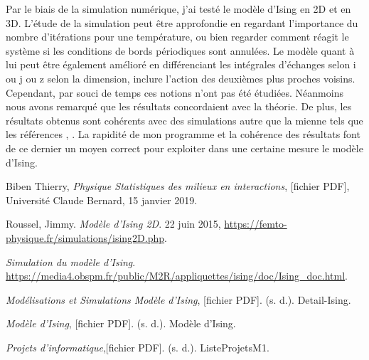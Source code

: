 \documentclass{article}
\begin{document}
Par le biais de la simulation numérique, j'ai testé le modèle d'Ising en 2D et en 3D. L'étude de la simulation peut être approfondie en regardant l'importance du nombre d'itérations pour une température, ou bien regarder comment réagit le système si les conditions de bords périodiques sont annulées. Le modèle quant à lui peut être également amélioré en différenciant les intégrales d'échanges selon i ou j ou z selon la dimension, inclure l'action des deuxièmes plus proches voisins. Cependant, par souci de temps ces notions n'ont pas été étudiées. Néanmoins nous avons remarqué que les résultats concordaient avec la théorie. De plus, les résultats obtenus sont cohérents avec des simulations autre que la mienne tels que les références \cite{Simu}, \cite{Obs}. La rapidité de mon programme et la cohérence des résultats font de ce dernier un moyen correct pour exploiter dans une certaine mesure le modèle d'Ising.


\newpage
\begin{thebibliography}{99}
Biben Thierry, \emph{Physique Statistiques des milieux en interactions}, [fichier PDF], Université Claude Bernard, 15 janvier 2019.

Roussel, Jimmy. \emph{Modèle d’Ising 2D}. 22 juin 2015, \url{https://femto-physique.fr/simulations/ising2D.php}.

\emph{Simulation du modèle d’Ising}. \url{https://media4.obspm.fr/public/M2R/appliquettes/ising/doc/Ising_doc.html}.


\emph{Modélisations et Simulations Modèle d'Ising}, [fichier PDF]. (s. d.). Detail-Ising.

\emph{Modèle d'Ising},  [fichier PDF]. (s. d.). Modèle d’Ising.

\emph{Projets d’informatique},[fichier PDF]. (s. d.). ListeProjetsM1.


\end{thebibliography}
\end{document}
